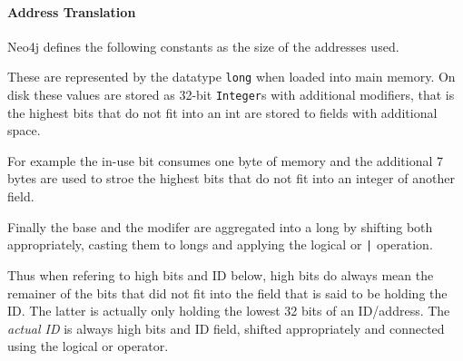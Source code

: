             \paragraph{Address Translation}
                Neo4j defines the following constants as the size of the addresses used.
                \begin{figure}[htp]\label{addrsize}
                \end{figure}
                These are represented by the datatype \texttt{long} when loaded into main memory. 
                On disk these values are stored as 32-bit \texttt{Integer}s with additional modifiers, that is the highest bits that do not fit into an int are stored to fields with additional space.
                
                For example the in-use bit consumes one byte of memory and the additional 7 bytes are used to stroe the highest bits that do not fit into an integer of another field.
                
                Finally the base and the modifer are aggregated into a long by shifting both appropriately, casting them to longs and applying the logical or \texttt{|} operation.
                
                Thus when refering to high bits and ID below, high bits do always mean the remainer of the bits that did not fit into the field that is said to be holding the ID\@.
                The latter is actually only holding the lowest 32 bits of an ID/address. The \textit{actual ID} is always high bits and ID field, shifted appropriately and connected using the logical or operator.
                
